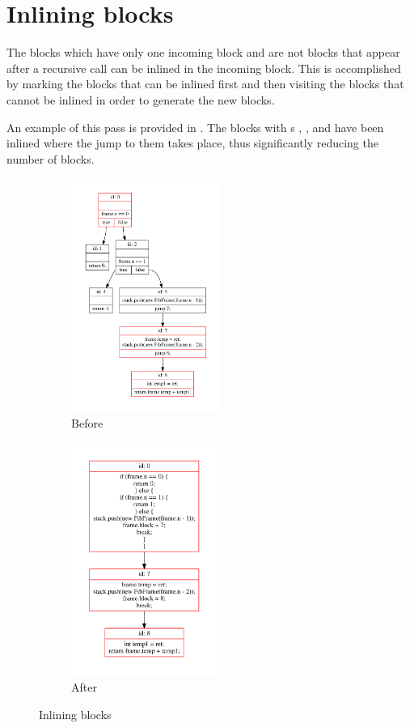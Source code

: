 \section{Inlining blocks}

The blocks which have only one incoming block and are not blocks that appear after a recursive call can be inlined in
the incoming block. This is accomplished by marking the blocks that can be inlined first and then visiting the blocks
that cannot be inlined in order to generate the new blocks.

An example of this pass is provided in . The blocks with s ,
,  and  have been inlined where the jump to them takes place, thus significantly reducing the
number of blocks.

\begin{figure}[htb]
    \begin{subfigure}[b]{.5\textwidth}
        \centering
        \includegraphics[height=3in]{src/graph/inline-before.pdf}
        \caption{Before}
    \end{subfigure}
    \begin{subfigure}[b]{.5\textwidth}
        \centering
        \includegraphics[height=3in]{src/graph/inline-after.pdf}
        \caption{After}
    \end{subfigure}
    \caption{Inlining blocks \label{img:inline-blocks}}
\end{figure}